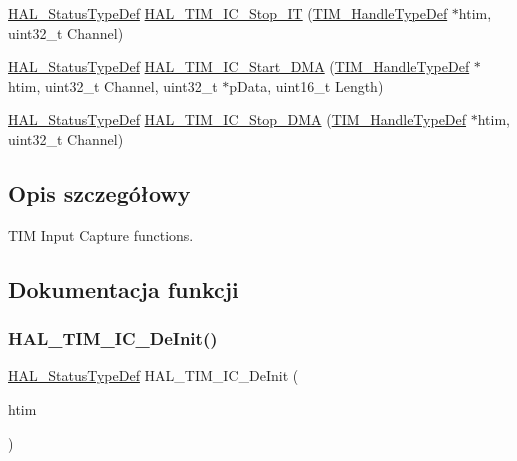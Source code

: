 \begin{DoxyCompactItemize}
\item 
\hyperlink{stm32f4xx__hal__def_8h_a63c0679d1cb8b8c684fbb0632743478f}{H\+A\+L\+\_\+\+Status\+Type\+Def} \hyperlink{group___t_i_m___exported___functions___group4_gaf5664e207667c99ef50378813056e5f6}{H\+A\+L\+\_\+\+T\+I\+M\+\_\+\+I\+C\+\_\+\+Stop\+\_\+\+IT} (\hyperlink{struct_t_i_m___handle_type_def}{T\+I\+M\+\_\+\+Handle\+Type\+Def} $\ast$htim, uint32\+\_\+t Channel)
\item 
\hyperlink{stm32f4xx__hal__def_8h_a63c0679d1cb8b8c684fbb0632743478f}{H\+A\+L\+\_\+\+Status\+Type\+Def} \hyperlink{group___t_i_m___exported___functions___group4_gac3b7deffff43a8bdc3e2eea42115efff}{H\+A\+L\+\_\+\+T\+I\+M\+\_\+\+I\+C\+\_\+\+Start\+\_\+\+D\+MA} (\hyperlink{struct_t_i_m___handle_type_def}{T\+I\+M\+\_\+\+Handle\+Type\+Def} $\ast$htim, uint32\+\_\+t Channel, uint32\+\_\+t $\ast$p\+Data, uint16\+\_\+t Length)
\item 
\hyperlink{stm32f4xx__hal__def_8h_a63c0679d1cb8b8c684fbb0632743478f}{H\+A\+L\+\_\+\+Status\+Type\+Def} \hyperlink{group___t_i_m___exported___functions___group4_ga8e7dc17f058ef9c826774436d68f80b5}{H\+A\+L\+\_\+\+T\+I\+M\+\_\+\+I\+C\+\_\+\+Stop\+\_\+\+D\+MA} (\hyperlink{struct_t_i_m___handle_type_def}{T\+I\+M\+\_\+\+Handle\+Type\+Def} $\ast$htim, uint32\+\_\+t Channel)
\end{DoxyCompactItemize}


\subsection{Opis szczegółowy}
T\+IM Input Capture functions. 



\subsection{Dokumentacja funkcji}
\mbox{\label{group___t_i_m___exported___functions___group4_ga2fc9af96c4ec45ba9057e182012f3586}} 
\subsubsection{\texorpdfstring{H\+A\+L\+\_\+\+T\+I\+M\+\_\+\+I\+C\+\_\+\+De\+Init()}{HAL\_TIM\_IC\_DeInit()}}
{\footnotesize\ttfamily \hyperlink{stm32f4xx__hal__def_8h_a63c0679d1cb8b8c684fbb0632743478f}{H\+A\+L\+\_\+\+Status\+Type\+Def} H\+A\+L\+\_\+\+T\+I\+M\+\_\+\+I\+C\+\_\+\+De\+Init (\begin{DoxyParamCaption}\item[{\hyperlink{struct_t_i_m___handle_type_def}{T\+I\+M\+\_\+\+Handle\+Type\+Def} $\ast$}]{htim }\end{DoxyParamCaption})}

